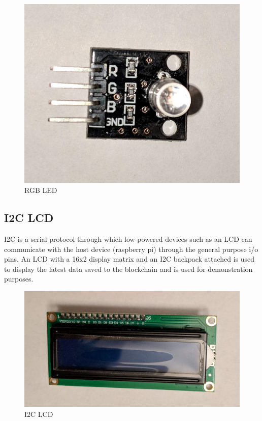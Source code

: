 \documentclass[11pt,openright]{report}
\begin{document}
\begin{figure}
    \centering
    \includegraphics[scale=0.1]{images/rgb_led.jpg}
    \caption{RGB LED}
    \label{fig:rgb_led}
\end{figure}

\subsection{I2C LCD}
I2C is a serial protocol through which low-powered devices such as an LCD can communicate with the host device (raspberry pi) through the general purpose i/o pins. 
An LCD with a 16x2 display matrix and an I2C backpack attached is used to display the latest data saved to the blockchain and is used for demonstration purposes. 
\begin{figure}
    \centering
    \includegraphics[scale=0.1]{images/i2c_lcd.jpg}
    \caption{I2C LCD}
    \label{fig:i2c_lcd}
\end{figure}
\end{document}
